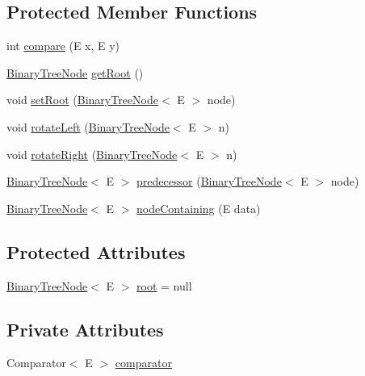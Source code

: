 \subsection*{Protected Member Functions}
\begin{DoxyCompactItemize}
\item 
int \hyperlink{class_binary_search_tree_af46a1a86813d1bdfe3f745bc3641391b}{compare} (E x, E y)
\item 
\hyperlink{interface_binary_tree_node}{Binary\+Tree\+Node} \hyperlink{class_binary_search_tree_ac6a71b51d00f3abe651eb14bbd5f2c59}{get\+Root} ()
\item 
void \hyperlink{class_binary_search_tree_a6fa21028fbf3da7d3b0c31354641284c}{set\+Root} (\hyperlink{interface_binary_tree_node}{Binary\+Tree\+Node}$<$ E $>$ node)
\item 
void \hyperlink{class_binary_search_tree_affe3b4c5e9e5e895e3e44c94de81b5b3}{rotate\+Left} (\hyperlink{interface_binary_tree_node}{Binary\+Tree\+Node}$<$ E $>$ n)
\item 
void \hyperlink{class_binary_search_tree_a69140db7c29fbc76c5d844350771cfe4}{rotate\+Right} (\hyperlink{interface_binary_tree_node}{Binary\+Tree\+Node}$<$ E $>$ n)
\item 
\hyperlink{interface_binary_tree_node}{Binary\+Tree\+Node}$<$ E $>$ \hyperlink{class_binary_search_tree_a799d83bd6d39d322f1839e61e3d23fc4}{predecessor} (\hyperlink{interface_binary_tree_node}{Binary\+Tree\+Node}$<$ E $>$ node)
\item 
\hyperlink{interface_binary_tree_node}{Binary\+Tree\+Node}$<$ E $>$ \hyperlink{class_binary_search_tree_af3164d82d7ba30c495634fceeff9acd5}{node\+Containing} (E data)
\end{DoxyCompactItemize}
\subsection*{Protected Attributes}
\begin{DoxyCompactItemize}
\item 
\hyperlink{interface_binary_tree_node}{Binary\+Tree\+Node}$<$ E $>$ \hyperlink{class_binary_search_tree_a5702657bf1d1f9d2bf0d6d9f19252735}{root} = null
\end{DoxyCompactItemize}
\subsection*{Private Attributes}
\begin{DoxyCompactItemize}
\item 
Comparator$<$ E $>$ \hyperlink{class_binary_search_tree_a2c599d52b3d0ec2c0da5c9ba1d8a905b}{comparator}
\end{DoxyCompactItemize}


